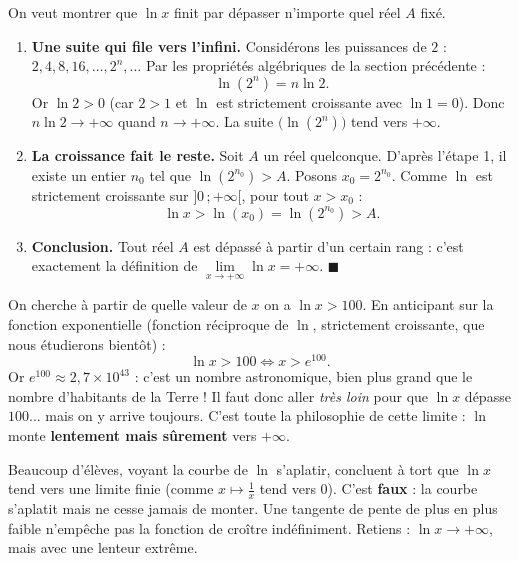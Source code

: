 \documentclass[11pt]{article}
\newcommand{\cle}[1]{{\popxbold\color{popdark}#1}}
\begin{document}
\begin{experience}
On veut montrer que $\ln x$ finit par dépasser n'importe quel réel $A$ fixé.
\begin{enumerate}
\item \textbf{Une suite qui file vers l'infini.} Considérons les puissances de $2$ : $2, 4, 8, 16, \ldots, 2^n, \ldots$ Par les propriétés algébriques de la section précédente :
\[
\ln(2^n) = n \ln 2.
\]
Or $\ln 2 > 0$ (car $2 > 1$ et $\ln$ est strictement croissante avec $\ln 1 = 0$). Donc $n \ln 2 \to +\infty$ quand $n \to +\infty$. La suite $\bigl(\ln(2^n)\bigr)$ tend vers $+\infty$.
\item \textbf{La croissance fait le reste.} Soit $A$ un réel quelconque. D'après l'étape 1, il existe un entier $n_0$ tel que $\ln(2^{n_0}) > A$. Posons $x_0 = 2^{n_0}$. Comme $\ln$ est \cle{strictement croissante} sur $]0\,;+\infty[$, pour tout $x > x_0$ :
\[
\ln x > \ln(x_0) = \ln(2^{n_0}) > A.
\]
\item \textbf{Conclusion.} Tout réel $A$ est dépassé à partir d'un certain rang : c'est exactement la définition de $\lim\limits_{x \to +\infty} \ln x = +\infty$. $\blacksquare$
\end{enumerate}
\end{experience}

\begin{exemplebox}
On cherche à partir de quelle valeur de $x$ on a $\ln x > 100$. En anticipant sur la fonction exponentielle (fonction réciproque de $\ln$, strictement croissante, que nous étudierons bientôt) :
\[
\ln x > 100 \iff x > e^{100}.
\]
Or $e^{100} \approx 2{,}7 \times 10^{43}$ : c'est un nombre astronomique, bien plus grand que le nombre d'habitants de la Terre ! Il faut donc aller \emph{très loin} pour que $\ln x$ dépasse $100$... mais on y arrive toujours. C'est toute la philosophie de cette limite : $\ln$ monte \textbf{lentement mais sûrement} vers $+\infty$.
\end{exemplebox}

\begin{attention}
Beaucoup d'élèves, voyant la courbe de $\ln$ s'aplatir, concluent à tort que $\ln x$ tend vers une limite finie (comme $x \mapsto \frac{1}{x}$ tend vers $0$). C'est \textbf{faux} : la courbe s'aplatit mais ne cesse jamais de monter. Une tangente de pente de plus en plus faible n'empêche pas la fonction de croître indéfiniment. Retiens : $\ln x \to +\infty$, mais avec une \cle{lenteur extrême}.
\end{attention}
\end{document}
